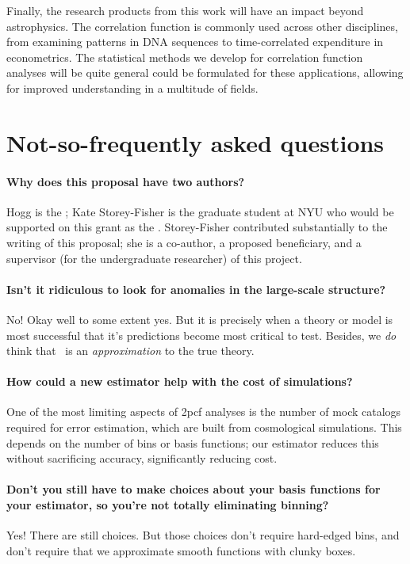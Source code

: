 \documentclass[12pt, fullpage, letterpaper]{article}
\newcommand{\cf}{2pcf\xspace}
\begin{document}
Finally, the research products from this work will have an impact beyond astrophysics.
The correlation function is commonly used across other disciplines, from examining patterns in DNA sequences to time-correlated expenditure in econometrics.
The statistical methods we develop for correlation function analyses will be quite general could be formulated for these applications, allowing for improved understanding in a multitude of fields.

\section{Not-so-frequently asked questions}

\paragraph{Why does this proposal have two authors?}
Hogg is the \PI; Kate Storey-Fisher is the graduate student at NYU who would be supported on this grant as the \GRA.
Storey-Fisher contributed substantially to the writing of this proposal; she is a co-author, a proposed beneficiary, and a supervisor (for the undergraduate researcher) of this project.

\paragraph{Isn't it ridiculous to look for anomalies in the large-scale structure?}
No! Okay well to some extent yes. But it is precisely when a theory or model is most successful that it's predictions become most critical to test. Besides, we \emph{do} think that \LCDM\ is an \emph{approximation} to the true theory.

\paragraph{How could a new estimator help with the cost of simulations?}
One of the most limiting aspects of \cf analyses is the number of mock catalogs required for error estimation, which are built from cosmological simulations. This depends on the number of bins or basis functions; our estimator reduces this without sacrificing accuracy, significantly reducing cost.

\paragraph{Don't you still have to make choices about your basis functions for your estimator, so you're not totally eliminating binning?}
Yes! There are still choices. But those choices don't require hard-edged bins, and don't require that we approximate smooth functions with clunky boxes.
\end{document}
